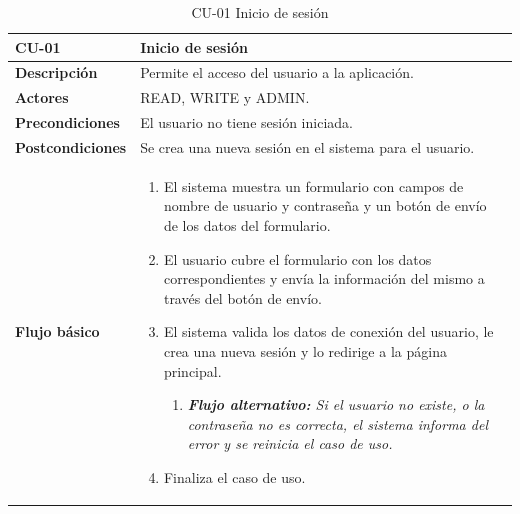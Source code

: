 \begin{table} [H]
    \centering
    \setlength{\leftmargini}{0.4cm}
	\resizebox{15cm}{!} { %
    \begin{tabular}{| m{3cm} | m{12cm} |}   
    \hline
	  \textbf{CU-01} & \textbf{Inicio de sesión} \\\hline
	  \textbf{Descripción} & Permite el acceso del usuario a la aplicación. \\\hline
	  \textbf{Actores} & READ, WRITE y ADMIN. \\\hline
	  \textbf{Precondiciones} & El usuario no tiene sesión iniciada. \\\hline
	  \textbf{Postcondiciones} & Se crea una nueva sesión en el sistema para el usuario. \\\hline
	  \textbf{Flujo básico} & 
		\begin{enumerate}
	  	\item El sistema muestra un formulario con campos de nombre de usuario y contraseña y un botón de envío de los datos del formulario.
		\item El usuario cubre el formulario con los datos correspondientes y envía la información del mismo a través del botón de envío.
	  	\item El sistema valida los datos de conexión del usuario, le crea una nueva sesión y lo redirige a la página principal.	
	  	\begin{enumerate}
		   \item \textit{\textbf{Flujo alternativo:} Si el usuario no existe, o la contraseña no es correcta, el sistema informa del
error y se reinicia el caso de uso.}
		\end{enumerate}   	
	   	\item Finaliza el caso de uso.
	  \end{enumerate} 	  	  
	  \\\hline
    \end{tabular}
    } %
    \caption{CU-01 Inicio de sesión}
    \label{tab:cu-inicio-sesion}
\end{table}




